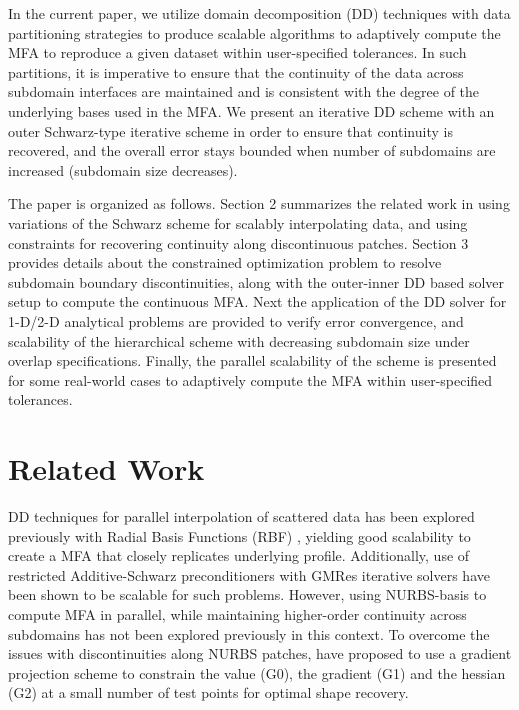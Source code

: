 \documentclass[conference]{IEEEtran}
\begin{document}
In the current paper, we utilize domain decomposition (DD) techniques \cite{smith-ddm} with data partitioning strategies to produce scalable algorithms to adaptively compute the MFA to reproduce a given dataset within user-specified tolerances. In such partitions, it is imperative to ensure that the continuity of the data across subdomain interfaces are maintained and is consistent with the degree of the underlying bases used in the MFA. 
We present an iterative DD scheme with an outer Schwarz-type iterative scheme in order to ensure that continuity is recovered, and the overall error stays bounded when number of subdomains are increased (subdomain size decreases).



The paper is organized as follows. Section 2 summarizes the related work in using variations of the Schwarz scheme for scalably interpolating data, and using constraints for recovering continuity along discontinuous patches. Section 3 provides details about the constrained optimization problem to resolve subdomain boundary discontinuities, along with the outer-inner DD based solver setup to compute the continuous MFA. Next the application of the DD solver for 1-D/2-D analytical problems are provided to verify error convergence, and scalability of the hierarchical scheme with decreasing subdomain size under overlap specifications. Finally, the parallel scalability of the scheme is presented for some real-world cases to adaptively compute the MFA within user-specified tolerances.


\section{Related Work}

DD techniques for parallel interpolation of scattered data has been explored previously with Radial Basis Functions (RBF) \cite{mai-approx-rbf}, yielding good scalability to create a MFA that closely replicates underlying profile. Additionally, use of restricted Additive-Schwarz preconditioners with GMRes iterative solvers have been shown to be scalable \cite{yokota-rasm-rbf} for such problems. However, using NURBS-basis to compute MFA in parallel, while maintaining higher-order continuity across subdomains has not been explored previously in this context. To overcome the issues with discontinuities along NURBS patches, \cite{zhang-nurbs-continuity} have proposed to use a gradient projection scheme to constrain the value (G0), the gradient (G1) and the hessian (G2) at a small number of test points for optimal shape recovery. 
\end{document}
